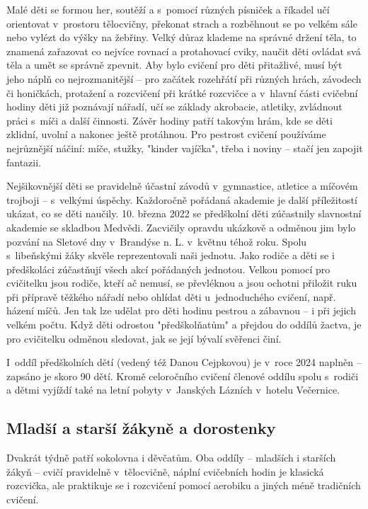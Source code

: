 \documentclass[a5paper, 12pt, twoside]{article}
\begin{document}
Malé děti se formou her, soutěží a s~pomocí různých písniček a říkadel
učí orientovat v~prostoru tělocvičny, překonat strach a rozběhnout se po
velkém sále nebo vylézt do výšky na žebřiny. Velký důraz klademe na
správné držení těla, to znamená zařazovat co nejvíce rovnací a
protahovací cviky, naučit děti ovládat svá těla a umět se správně
zpevnit. Aby bylo cvičení pro děti přitažlivé, musí být jeho náplň co
nejrozmanitější -- pro začátek rozehřátí při různých hrách, závodech či
honičkách, protažení a rozcvičení při krátké rozcvičce a v~hlavní části
cvičební hodiny děti již poznávají nářadí, učí se základy akrobacie,
atletiky, zvládnout práci s~míči a další činnosti. Závěr hodiny patří
takovým hrám, kde se děti zklidní, uvolní a nakonec ještě protáhnou. Pro
pestrost cvičení používáme nejrůznější náčiní: míče, stužky, "kinder
vajíčka", třeba i noviny -- stačí jen zapojit fantazii.

Nejšikovnější děti se pravidelně účastní závodů v~gymnastice, atletice a
míčovém trojboji -- s~velkými úspěchy. Každoročně pořádaná akademie je
další příležitostí ukázat, co se děti naučily. 10. března 2022 se
předškolní děti zúčastnily slavnostní akademie se skladbou Medvědi.
Zacvičily opravdu ukázkově a odměnou jim bylo pozvání na Sletové dny
v~Brandýse n. L. v~květnu téhož roku. Spolu s~libeňskými žáky skvěle
reprezentovali naši jednotu. Jako rodiče a děti se i předškoláci
zúčastňují všech akcí pořádaných jednotou. Velkou pomocí pro cvičitelku
jsou rodiče, kteří ač nemusí, se převléknou a jsou ochotni přiložit ruku
při přípravě těžkého nářadí nebo ohlídat děti u~jednoduchého cvičení,
např. házení míčů. Jen tak lze udělat pro děti hodinu pestrou a zábavnou
-- i při jejich velkém počtu. Když děti odrostou "předškolňatům" a
přejdou do oddílů žactva, je pro cvičitelku odměnou sledovat, jak se
její bývalí svěřenci činí.

I~oddíl předškolních dětí (vedený též Danou Cejpkovou) je v~roce 2024
naplněn -- zapsáno je skoro 90 dětí. Kromě celoročního cvičení členové
oddílu spolu s~rodiči a dětmi vyjíždí také na letní pobyty v~Janských
Lázních v~hotelu Večernice.

\subsection{Mladší a starší žákyně a
dorostenky}

Dvakrát týdně patří sokolovna i děvčatům. Oba oddíly -- mladších i
starších žákyň -- cvičí pravidelně v~tělocvičně, náplní cvičebních hodin
je klasická rozcvička, ale praktikuje se i rozcvičení pomocí aerobiku a
jiných méně tradičních cvičení.
\end{document}
